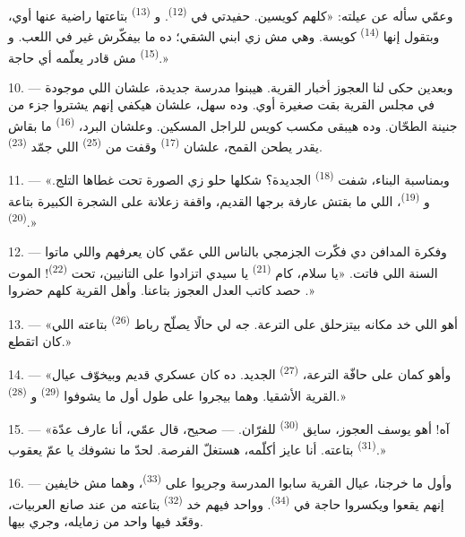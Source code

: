 وعمّي سأله عن عيلته: «كلهم كويسين. حفيدتي في  \textsuperscript{(12)}.
و \textsuperscript{(13)} بتاعتها راضية عنها أوي، وبتقول إنها
 \textsuperscript{(14)} كويسة. وهي مش زي ابني الشقي؛ ده ما بيفكّرش غير
في اللعب. و \textsuperscript{(15)} مش قادر يعلّمه أي حاجة.»

\VUsaut{3.0mm}
\VUsaut{3.0mm}

10. --- وبعدين حكى لنا العجوز أخبار القرية. هيبنوا مدرسة جديدة، علشان اللي
موجودة في مجلس القرية بقت صغيرة أوي. وده سهل، علشان هيكفي إنهم يشتروا جزء من
جنينة الطحّان. وده هيبقى مكسب كويس للراجل المسكين. وعلشان البرد، 
 \textsuperscript{(16)} ما بقاش يقدر يطحن القمح، علشان
 \textsuperscript{(17)} وقفت من  \textsuperscript{(25)} اللي
جمّد  \textsuperscript{(23)}.

11. --- «وبمناسبة البناء، شفت  \textsuperscript{(18)} الجديدة؟ شكلها
حلو زي الصورة تحت غطاها التلج. و \textsuperscript{(19)}، اللي ما
بقتش عارفة برجها القديم، واقفة زعلانة على الشجرة الكبيرة بتاعة 
\textsuperscript{(20)}.»

12. --- وفكرة المدافن دي فكّرت الجزمجي بالناس اللي عمّي كان يعرفهم واللي ماتوا
السنة اللي فاتت. «يا سلام، كام  \textsuperscript{(21)} يا سيدي اتزادوا
على التانيين، تحت  \textsuperscript{(22)}! الموت حصد كاتب العدل
العجوز بتاعنا. وأهل القرية كلهم حضروا .»

13. --- «أهو اللي خد مكانه بيتزحلق على الترعة. جه لي حالًا يصلّح رباط
 \textsuperscript{(26)} بتاعته اللي كان اتقطع.»

14. --- «وأهو كمان على حافّة الترعة،  \textsuperscript{(27)} الجديد.
ده كان عسكري قديم وبيخوّف عيال القرية الأشقيا. وهما بيجروا على طول أول ما
يشوفوا  \textsuperscript{(29)} و \textsuperscript{(28)}.»

15. --- «آه! أهو يوسف العجوز، سايق 
\textsuperscript{(30)} للفرّان. --- صحيح، قال عمّي، أنا عارف عدّة 
\textsuperscript{(31)} بتاعته. أنا عايز أكلّمه، هستغلّ الفرصة. لحدّ ما نشوفك يا عمّ
يعقوب.»

16. --- وأول ما خرجنا، عيال القرية سابوا المدرسة وجريوا على 
\textsuperscript{(33)}، وهما مش خايفين إنهم يقعوا ويكسروا حاجة في 
\textsuperscript{(34)}. وواحد فيهم خد  \textsuperscript{(32)} بتاعته من
عند صانع العربيات، وقعّد فيها واحد من زمايله، وجري بيها.

